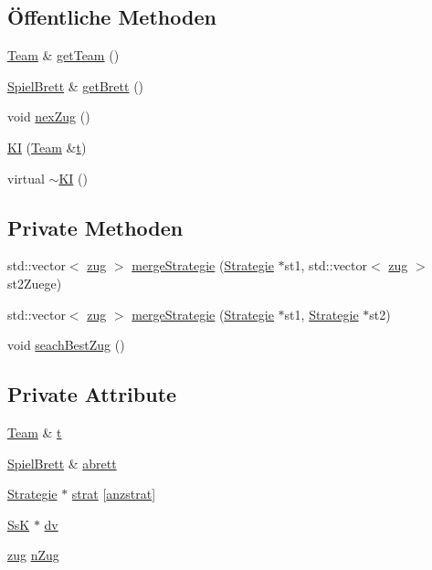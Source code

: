 \subsection*{Öffentliche Methoden}
\begin{DoxyCompactItemize}
\item 
\hyperlink{class_team}{Team} \& \hyperlink{class_k_i_a731391b304aaf237500db42f8dee4690}{get\+Team} ()
\item 
\hyperlink{class_spiel_brett}{Spiel\+Brett} \& \hyperlink{class_k_i_a204bc5eb350c5d7cfc5f7e56fff9690c}{get\+Brett} ()
\item 
void \hyperlink{class_k_i_a840820c024ad7069c2064fc30f964169}{nex\+Zug} ()
\item 
\hyperlink{class_k_i_aa3c0a5eadcdf9c5fee6d8180dac17d0a}{K\+I} (\hyperlink{class_team}{Team} \&\hyperlink{class_k_i_a611b37548d94d9dce7e68024aa943733}{t})
\item 
virtual \hyperlink{class_k_i_afd1109cfccff505f519d60d9958efad9}{$\sim$\+K\+I} ()
\end{DoxyCompactItemize}
\subsection*{Private Methoden}
\begin{DoxyCompactItemize}
\item 
std\+::vector$<$ \hyperlink{structzug}{zug} $>$ \hyperlink{class_k_i_af4bec8491d051702c49d780a25feb1cb}{merge\+Strategie} (\hyperlink{class_strategie}{Strategie} $\ast$st1, std\+::vector$<$ \hyperlink{structzug}{zug} $>$ st2\+Zuege)
\item 
std\+::vector$<$ \hyperlink{structzug}{zug} $>$ \hyperlink{class_k_i_ae97a6dd7ab3de2a934ca5c28c4cc63b3}{merge\+Strategie} (\hyperlink{class_strategie}{Strategie} $\ast$st1, \hyperlink{class_strategie}{Strategie} $\ast$st2)
\item 
void \hyperlink{class_k_i_afa90fdb068e7b06e58db40b1ceeb8216}{seach\+Best\+Zug} ()
\end{DoxyCompactItemize}
\subsection*{Private Attribute}
\begin{DoxyCompactItemize}
\item 
\hyperlink{class_team}{Team} \& \hyperlink{class_k_i_a611b37548d94d9dce7e68024aa943733}{t}
\item 
\hyperlink{class_spiel_brett}{Spiel\+Brett} \& \hyperlink{class_k_i_a93f7368fa6746ddb1e51d804ddaea096}{abrett}
\item 
\hyperlink{class_strategie}{Strategie} $\ast$ \hyperlink{class_k_i_a6e07007b67f0a2778de3148ed5612921}{strat} \mbox{[}\hyperlink{class_k_i_a16d7b067120b9b638781d5e5e6dcc005}{anzstrat}\mbox{]}
\item 
\hyperlink{class_ss_k}{Ss\+K} $\ast$ \hyperlink{class_k_i_a34cb945060f752556a068ccf1771c531}{dv}
\item 
\hyperlink{structzug}{zug} \hyperlink{class_k_i_acfefb24fdddb36cbfe2dff9e1d5d8296}{n\+Zug}
\end{DoxyCompactItemize}
